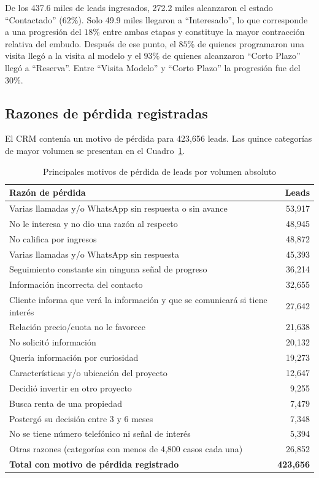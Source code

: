 De los 437.6 miles de leads ingresados, 272.2 miles alcanzaron el estado ``Contactado'' ($62\%$). Solo 49.9 miles llegaron a ``Interesado'', lo que corresponde a una progresión del $18\%$ entre ambas etapas y constituye la mayor contracción relativa del embudo. Después de ese punto, el $85\%$ de quienes programaron una visita llegó a la visita al modelo y el $93\%$ de quienes alcanzaron ``Corto Plazo'' llegó a ``Reserva''. Entre ``Visita Modelo'' y ``Corto Plazo'' la progresión fue del $30\%$.


\subsection{Razones de pérdida registradas}
\label{subsubsec:razones-perdida}

El CRM contenía un motivo de pérdida para 423{,}656 leads. Las quince categorías de mayor volumen se presentan en el Cuadro~\ref{tab:razones-perdida}.

\begin{table}[H]
\centering
\caption{Principales motivos de pérdida de leads por volumen absoluto}
\label{tab:razones-perdida}
\small
\begin{tabular}{p{8.5cm}r}
\hline
\textbf{Razón de pérdida} & \textbf{Leads} \\ \hline
Varias llamadas y/o WhatsApp sin respuesta o sin avance & 53{,}917 \\
No le interesa y no dio una razón al respecto & 48{,}945 \\
No califica por ingresos & 48{,}872 \\
Varias llamadas y/o WhatsApp sin respuesta & 45{,}393 \\
Seguimiento constante sin ninguna señal de progreso & 36{,}214 \\
Información incorrecta del contacto & 32{,}655 \\
Cliente informa que verá la información y que se comunicará si tiene interés & 27{,}642 \\
Relación precio/cuota no le favorece & 21{,}638 \\
No solicitó información & 20{,}132 \\
Quería información por curiosidad & 19{,}273 \\
Características y/o ubicación del proyecto & 12{,}647 \\
Decidió invertir en otro proyecto & 9{,}255 \\
Busca renta de una propiedad & 7{,}479 \\
Postergó su decisión entre 3 y 6 meses & 7{,}348 \\
No se tiene número telefónico ni señal de interés & 5{,}394 \\ \hline
Otras razones (categorías con menos de 4{,}800 casos cada una) & 26{,}852 \\ \hline
\textbf{Total con motivo de pérdida registrado} & \textbf{423{,}656} \\ \hline
\end{tabular}
\fuentepropia
\end{table}

